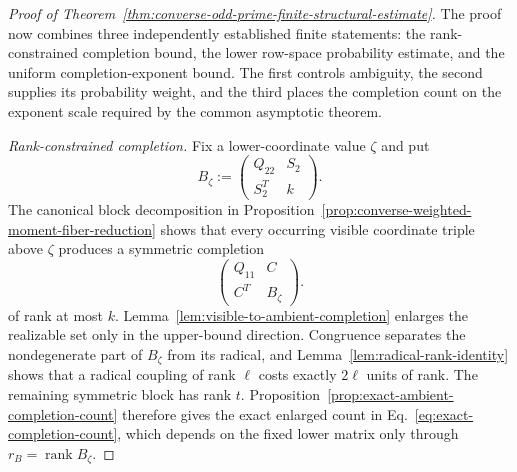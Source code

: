 \documentclass[11pt]{article}
\newcommand{\rank}{\operatorname{rank}}
\newcommand{\1}{\mathbf 1}
\theoremstyle{plain}
\theoremstyle{definition}
\theoremstyle{remark}
\begin{document}
\begin{proof}[Proof of Theorem~\ref{thm:converse-odd-prime-finite-structural-estimate}]
The proof now combines three independently established finite statements: the
rank-constrained completion bound, the lower row-space probability estimate,
and the uniform completion-exponent bound.  The first controls ambiguity, the
second supplies its probability weight, and the third places the completion
count on the exponent scale required by the common asymptotic theorem.

\smallskip
\noindent\emph{Rank-constrained completion.}
Fix a lower-coordinate value $\zeta$ and put
\begin{equation}
 B_{\zeta}:=
 \begin{pmatrix}Q_{22}&S_2\\S_2^T&k\end{pmatrix}.
 \label{eq:theorem-B-B-zeta}
\end{equation}
The canonical block decomposition in Proposition~\ref{prop:converse-weighted-moment-fiber-reduction}
shows that every occurring visible coordinate triple above $\zeta$ produces a
symmetric completion
\begin{equation}
 \begin{pmatrix}Q_{11}&C\\C^T&B_{\zeta}\end{pmatrix}.
 \label{eq:theorem-B-completion-matrix}
\end{equation}
of rank at most $k$.  Lemma~\ref{lem:visible-to-ambient-completion} enlarges
the realizable set only in the upper-bound direction.  Congruence separates
the nondegenerate part of $B_{\zeta}$ from its radical, and
Lemma~\ref{lem:radical-rank-identity} shows that a radical coupling of rank
$\ell$ costs exactly $2\ell$ units of rank.  The remaining symmetric block has
rank $t$.  Proposition~\ref{prop:exact-ambient-completion-count} therefore
gives the exact enlarged count in Eq.~\eqref{eq:exact-completion-count}, which
depends on the fixed lower matrix only through
$r_B=\rank B_{\zeta}$.


\end{proof}
\end{document}
